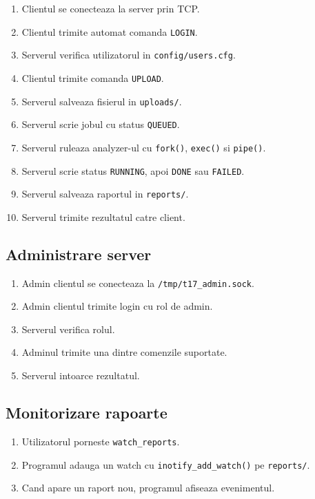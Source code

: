 \documentclass[12pt,a4paper]{article}
\begin{document}
\begin{enumerate}
    \item Clientul se conecteaza la server prin TCP.
    \item Clientul trimite automat comanda \texttt{LOGIN}.
    \item Serverul verifica utilizatorul in \texttt{config/users.cfg}.
    \item Clientul trimite comanda \texttt{UPLOAD}.
    \item Serverul salveaza fisierul in \texttt{uploads/}.
    \item Serverul scrie jobul cu status \texttt{QUEUED}.
    \item Serverul ruleaza analyzer-ul cu \texttt{fork()}, \texttt{exec()} si \texttt{pipe()}.
    \item Serverul scrie status \texttt{RUNNING}, apoi \texttt{DONE} sau \texttt{FAILED}.
    \item Serverul salveaza raportul in \texttt{reports/}.
    \item Serverul trimite rezultatul catre client.
\end{enumerate}

\subsection{Administrare server}

\begin{enumerate}
    \item Admin clientul se conecteaza la \texttt{/tmp/t17\_admin.sock}.
    \item Admin clientul trimite login cu rol de admin.
    \item Serverul verifica rolul.
    \item Adminul trimite una dintre comenzile suportate.
    \item Serverul intoarce rezultatul.
\end{enumerate}

\subsection{Monitorizare rapoarte}

\begin{enumerate}
    \item Utilizatorul porneste \texttt{watch\_reports}.
    \item Programul adauga un watch cu \texttt{inotify\_add\_watch()} pe \texttt{reports/}.
    \item Cand apare un raport nou, programul afiseaza evenimentul.
\end{enumerate}
\end{document}
